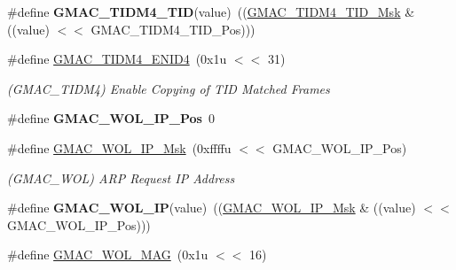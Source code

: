 \begin{DoxyCompactItemize}
\mbox{\label{group__SAMV71__GMAC_gab9397d8e34dca72734b019b92067c66b}} 
\#define {\bfseries G\+M\+A\+C\+\_\+\+T\+I\+D\+M4\+\_\+\+T\+ID}(value)~((\mbox{\hyperlink{group__SAMV71__GMAC_ga8ff11c8fe9e79c07cb9169549b3fcd62}{G\+M\+A\+C\+\_\+\+T\+I\+D\+M4\+\_\+\+T\+I\+D\+\_\+\+Msk}} \& ((value) $<$$<$ G\+M\+A\+C\+\_\+\+T\+I\+D\+M4\+\_\+\+T\+I\+D\+\_\+\+Pos)))
\item 
\mbox{\label{group__SAMV71__GMAC_gad43fbc1ca24ce6ae11dff7a7351ce19d}} 
\#define \mbox{\hyperlink{group__SAMV71__GMAC_gad43fbc1ca24ce6ae11dff7a7351ce19d}{G\+M\+A\+C\+\_\+\+T\+I\+D\+M4\+\_\+\+E\+N\+I\+D4}}~(0x1u $<$$<$ 31)
\begin{DoxyCompactList}\small\item\em (G\+M\+A\+C\+\_\+\+T\+I\+D\+M4) Enable Copying of T\+ID Matched Frames \end{DoxyCompactList}\item 
\mbox{\label{group__SAMV71__GMAC_ga29bd5c1e8a78e286d366d25fd422b500}} 
\#define {\bfseries G\+M\+A\+C\+\_\+\+W\+O\+L\+\_\+\+I\+P\+\_\+\+Pos}~0
\item 
\mbox{\label{group__SAMV71__GMAC_ga6e4d108513c5f0c545cc95b0cdc93cd4}} 
\#define \mbox{\hyperlink{group__SAMV71__GMAC_ga6e4d108513c5f0c545cc95b0cdc93cd4}{G\+M\+A\+C\+\_\+\+W\+O\+L\+\_\+\+I\+P\+\_\+\+Msk}}~(0xffffu $<$$<$ G\+M\+A\+C\+\_\+\+W\+O\+L\+\_\+\+I\+P\+\_\+\+Pos)
\begin{DoxyCompactList}\small\item\em (G\+M\+A\+C\+\_\+\+W\+OL) A\+RP Request IP Address \end{DoxyCompactList}\item 
\mbox{\label{group__SAMV71__GMAC_ga370a8f199d31f90b885207b9b1fa29df}} 
\#define {\bfseries G\+M\+A\+C\+\_\+\+W\+O\+L\+\_\+\+IP}(value)~((\mbox{\hyperlink{group__SAMV71__GMAC_ga6e4d108513c5f0c545cc95b0cdc93cd4}{G\+M\+A\+C\+\_\+\+W\+O\+L\+\_\+\+I\+P\+\_\+\+Msk}} \& ((value) $<$$<$ G\+M\+A\+C\+\_\+\+W\+O\+L\+\_\+\+I\+P\+\_\+\+Pos)))
\item 
\mbox{\label{group__SAMV71__GMAC_ga8107b810c0592d5a390f110d9ee2cfda}} 
\#define \mbox{\hyperlink{group__SAMV71__GMAC_ga8107b810c0592d5a390f110d9ee2cfda}{G\+M\+A\+C\+\_\+\+W\+O\+L\+\_\+\+M\+AG}}~(0x1u $<$$<$ 16)
$$
\end{DoxyCompactItemize}
